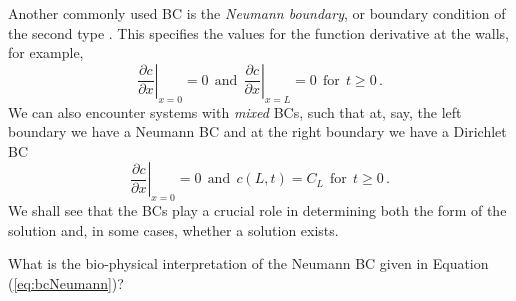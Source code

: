 \begin{example}
	Another commonly used BC is the \emph{Neumann boundary}, or boundary
	condition of the second
	type . This specifies the values for the function derivative at the walls, for
	example, 
	\begin{equation}
		\label{eq:bcNeumann}
		\left.\frac{\partial c}{\partial x}\right|_{x=0} = 0
		\ \ \text{and} \ \
		\left.\frac{\partial c}{\partial x}\right|_{x=L} = 0
		\ \ \text{for} \ \ t\geq 0 \, . 
	\end{equation}
	We can also encounter systems with \emph{mixed}  BCs, such that at, say, the left boundary we have
	a Neumann BC and at the right boundary we have a Dirichlet BC
	\begin{equation}
		\left.\frac{\partial c}{\partial x}\right|_{x=0} = 0
		\ \ \text{and} \ \
		c(L,t) = C_L  \ \ \text{for} \ \ t\geq 0 \, .
	\end{equation}
	We shall see that the BCs play a crucial role in determining both the form of the solution and, in
	some cases, whether a solution exists.
\end{example}


\begin{question}
	What is the bio-physical interpretation of the Neumann BC given in
	Equation (\ref{eq:bcNeumann})? 
\end{question}

